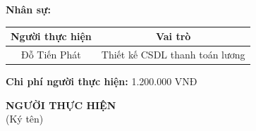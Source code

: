 {\begin{minipage}{\textwidth}
\begin{itemize}
    \end{itemize}
    \noindent \textbf{Nhân sự:}
    \begin{longtable}{|c|c|}
    \hline
    \textbf{Người thực hiện} & \textbf{Vai trò} \\
    \hline
    Đỗ Tiến Phát & Thiết kế CSDL thanh toán lương \\
    \hline
    \end{longtable}
    \noindent \textbf{Chi phí người thực hiện:} 1.200.000 VNĐ
    \vspace{1cm}
    \begin{flushleft}
        \hspace{8cm} \textbf{NGƯỜI THỰC HIỆN} \\
        \hspace{9.5cm} (Ký tên) \\
        \vspace{1cm}
    \end{flushleft}
	\end{minipage}
}    
